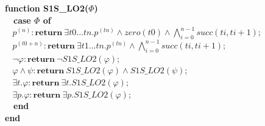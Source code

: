 \documentclass{article}
\begin{document}
\begin{multicols}{4}
\textbf{function S1S\_LO2($\Phi$)} \\
\ \ \textbf{case $\Phi$ of} \\
$\ \ \ \ p^{(n)} : \textbf{return}\ \exists t0...tn. p^{(tn)} \wedge zero(t0) \wedge \bigwedge_{i=0}^{n-1} succ(ti, ti + 1); $ \\
$\ \ \ \ p^{(t0 + n)} : \textbf{return}\ \exists t1...tn. p^{(tn)} \wedge \bigwedge_{i=0}^{n-1} succ(ti, ti + 1); $ \\
$\ \ \ \ \neg \varphi : \textbf{return}\ \neg S1S\_LO2(\varphi); $ \\
$\ \ \ \ \varphi \wedge \psi : \textbf{return}\ S1S\_LO2(\varphi) \wedge S1S\_LO2(\psi); $ \\
$\ \ \ \ \exists t.\varphi : \textbf{return}\ \exists t.S1S\_LO2(\varphi);$ \\
$\ \ \ \ \exists p.\varphi : \textbf{return}\ \exists p.S1S\_LO2(\varphi); $ \\
\ \ \textbf{end} \\
\textbf{end} \\



\end{multicols}
\end{document}
